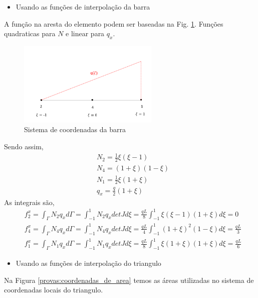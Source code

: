 %
\begin{itemize}
	\item Usando as funções de interpolação da barra
\end{itemize}
%
A função na aresta do elemento podem ser baseadas na Fig. \ref{provas:Lado do triangulo}. Funções quadraticas para $N$ e linear para $q_x$.
%
\begin{figure}[H]
	\includegraphics[width=0.6\textwidth,center]{fig/q1_prova_2012.PNG}
	\caption{Sistema de coordenadas da barra} 
	\label{provas:Lado do triangulo}
\end{figure}
%
Sendo assim,
%
\begin{equation}
	\begin{split}
	&N_2 = \frac{1}{2} \xi (\xi - 1) \\ 
	&N_4 = (1 + \xi) (1 - \xi) \\ 
	&N_1 = \frac{1}{2} \xi (1 + \xi)\\
	&q_x = \frac{q}{2} (1 + \xi)
	\end{split}  
\end{equation}
%
As integrais são,
\begin{equation}
	\begin{split}
		&f_2^x = \int_{\Gamma} N_2 q_x d\Gamma = \int_{-1}^{1} N_2 q_x det J d\xi = \frac{q L}{8} \int_{-1}^{1} \xi (\xi - 1) (1 + \xi) d\xi = 0\\
		&f_4^x = \int_{\Gamma} N_4 q_x d\Gamma = \int_{-1}^{1} N_4 q_x det J d\xi = \frac{q L}{4} \int_{-1}^{1} (1 + \xi)^2 (1 - \xi) d\xi =  \frac{q L}{3}\\
		&f_1^x = \int_{\Gamma} N_1 q_x d\Gamma = \int_{-1}^{1} N_1 q_x det J d\xi = \frac{q L}{8} \int_{-1}^{1} \xi (1 + \xi) (1 + \xi)  d\xi =  \frac{q L}{6}
	\end{split}
\end{equation}
%
 \begin{itemize}
	\item Usando as funções de interpolação do triangulo
\end{itemize}
%
Na Figura \ref{provas:coordenadas_de_area} temos as áreas utilizadas no sistema de coordenadas locais do triangulo. 
